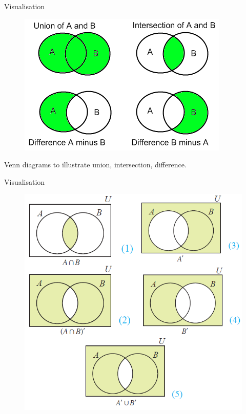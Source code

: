 \documentclass[11pt,aspectratio=43,ignorenonframetext,t]{beamer}
\begin{document}
\begin{frame}{Visualisation}
\begin{figure}
    \centering
    \includegraphics[width=0.7\linewidth]{Image2.png}
\end{figure}
Venn diagrams to illustrate union, intersection, difference.
\end{frame}

\begin{frame}{Visualisation}
\begin{figure}
    \centering
    \includegraphics[width=0.7\linewidth]{Image3.png}
\end{figure}
\end{frame}
\end{document}
